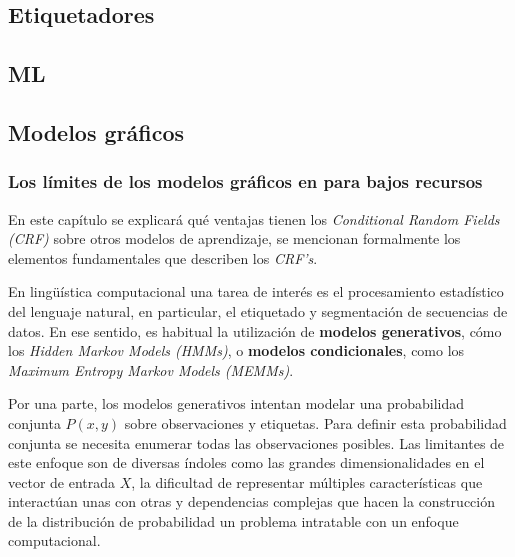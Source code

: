 \documentclass[letterpaper,12pt,oneside]{book}
\begin{document}

	
	\subsection{Etiquetadores}

	
	\subsection{ML}

	
	\subsection{Modelos gráficos}

	

	


	
	\subsubsection{Los límites de los modelos gráficos en para bajos recursos}

	
	En este capítulo se explicará qué ventajas tienen los \emph{Conditional Random Fields (CRF)} sobre otros modelos de aprendizaje, se mencionan formalmente los elementos fundamentales que describen los \emph{CRF's}.

	
	En lingüística computacional una tarea de interés es el procesamiento estadístico del lenguaje natural, en particular, el etiquetado y segmentación de secuencias de datos. En ese sentido, es habitual la utilización de \textbf{modelos generativos}, cómo los \textit{Hidden Markov Models (HMMs)}, o \textbf{modelos condicionales}, como los \textit{Maximum Entropy Markov Models (MEMMs)}.

	
	Por una parte, los modelos generativos intentan modelar una probabilidad conjunta $P(x,y)$ sobre observaciones y etiquetas. Para definir esta probabilidad conjunta se necesita enumerar todas las observaciones posibles. Las limitantes de este enfoque son de diversas índoles como las grandes dimensionalidades en el vector de entrada $X$, la dificultad de representar múltiples características que interactúan unas con otras y dependencias complejas que hacen la construcción de la distribución de probabilidad un problema intratable con un enfoque computacional.
\end{document}
